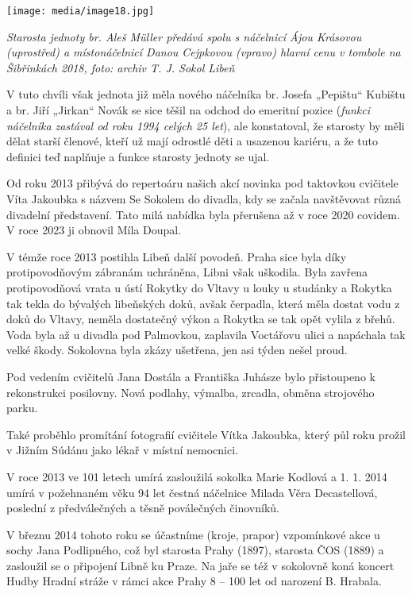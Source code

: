 \texttt{[image: media/image18.jpg]}

\emph{Starosta jednoty br. Aleš Müller předává spolu s náčelnicí Ájou
Krásovou (uprostřed) a místonáčelnicí Danou Cejpkovou (vpravo) hlavní
cenu v tombole na Šibřinkách 2018, foto: archiv T. J. Sokol Libeň}

V tuto chvíli však jednota již měla nového náčelníka br. Josefa
„Pepištu`` Kubištu a br. Jiří „Jirkan`` Novák se sice těšil na odchod do
emeritní pozice (\emph{funkci náčelníka zastával od roku 1994 celých 25
let}), ale konstatoval, že starosty by měli dělat starší členové, kteří
už mají odrostlé děti a usazenou kariéru, a že tuto definici teď
naplňuje a funkce starosty jednoty se ujal.

Od roku 2013 přibývá do repertoáru našich akcí novinka pod taktovkou
cvičitele Víta Jakoubka s názvem Se Sokolem do divadla, kdy se začala
navštěvovat různá divadelní představení. Tato milá nabídka byla
přerušena až v roce 2020 covidem. V roce 2023 ji obnovil Míla Doupal.

V témže roce 2013 postihla Libeň další povodeň. Praha sice byla díky
protipovodňovým zábranám uchráněna, Libni však uškodila. Byla zavřena
protipovodňová vrata u ústí Rokytky do Vltavy u louky u studánky a
Rokytka tak tekla do bývalých libeňských doků, avšak čerpadla, která
měla dostat vodu z doků do Vltavy, neměla dostatečný výkon a Rokytka se
tak opět vylila z břehů. Voda byla až u divadla pod Palmovkou, zaplavila
Voctářovu ulici a napáchala tak velké škody. Sokolovna byla zkázy
ušetřena, jen asi týden nešel proud.

Pod vedením cvičitelů Jana Dostála a Františka Juhásze bylo přistoupeno
k rekonstrukci posilovny. Nová podlahy, výmalba, zrcadla, obměna
strojového parku.

Také proběhlo promítání fotografií cvičitele Vítka Jakoubka, který půl
roku prožil v Jižním Súdánu jako lékař v místní nemocnici.

V roce 2013 ve 101 letech umírá zasloužilá sokolka Marie Kodlová a 1. 1.
2014 umírá v požehnaném věku 94 let čestná náčelnice Milada Věra
Decastellová, poslední z předválečných a těsně poválečných činovníků.

V březnu 2014 tohoto roku se účastníme (kroje, prapor) vzpomínkové akce
u sochy Jana Podlipného, což byl starosta Prahy (1897), starosta ČOS
(1889) a zasloužil se o připojení Libně ku Praze. Na jaře se též v
sokolovně koná koncert Hudby Hradní stráže v rámci akce Prahy 8 -- 100
let od narození B. Hrabala.

